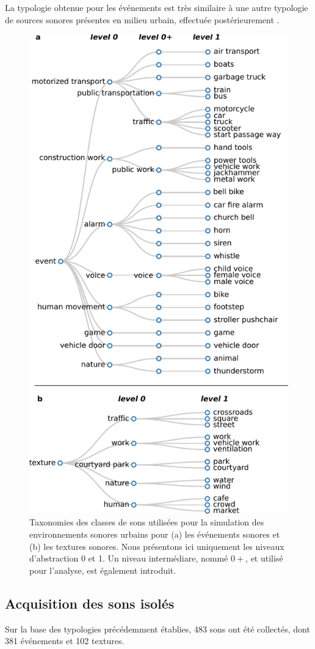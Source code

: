 La typologie obtenue pour les événements est très similaire à une autre  typologie de sources sonores présentes en milieu urbain, effectuée postérieurement \citep{Salamon14}. \\


\begin{figure}[bth]
        \myfloatalign
        \includegraphics[width=.5\linewidth]{gfxHierarchy/taxonomy}
       \caption[Taxonomies des classes de sons utilisées pour la simulation des environnements sonores urbains]{Taxonomies des classes de sons utilisées pour la simulation des environnements sonores urbains pour (a) les événements sonores et (b) les textures sonores. Nous présentons ici uniquement les niveaux d'abstraction 0 et 1. Un niveau intermédiare, nommé $0+$, et utilisé pour l'analyse, est également introduit.}\label{fig:taxonomie}
\end{figure}

\subsection{Acquisition des sons isolés}

Sur la base des typologies précédemment établies, 483 sons ont été collectés, dont 381  événements et 102  textures.

